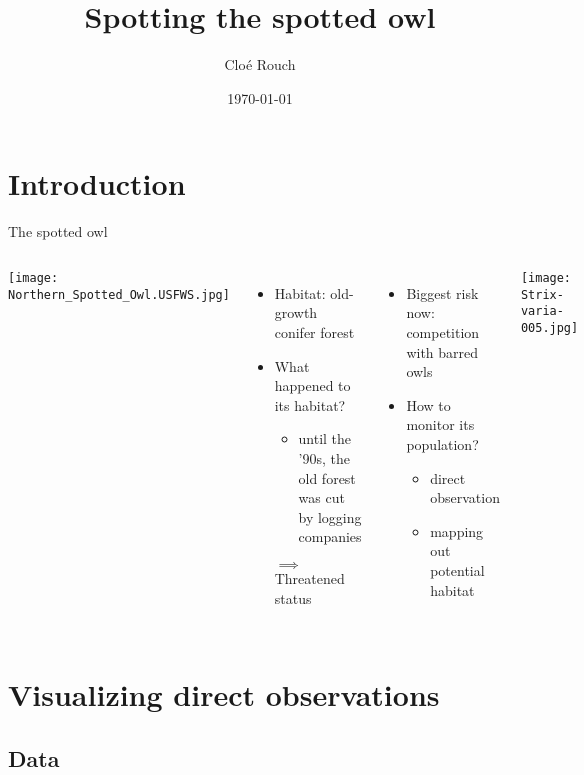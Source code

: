 \documentclass{beamer}
\title{Spotting the spotted owl}
\author{Cloé Rouch}
\date{\today}
\begin{document}
\maketitle

\section{Introduction}

\begin{frame}{The spotted owl}
    \begin{columns}
            \texttt{[image: Northern\_Spotted\_Owl.USFWS.jpg]} 
            \begin{itemize}
                \item Habitat: old-growth conifer forest
                \item What happened to its habitat?
                    \begin{itemize}
                        \item until the '90s, the old forest was cut by logging companies
                    \end{itemize}
                $\implies$ Threatened status 
            \end{itemize}
            \begin{itemize}
                \item Biggest risk now: competition with barred owls
                \item How to monitor its population?
                    \begin{itemize}
                        \item direct observation
                        \item mapping out potential habitat
                    \end{itemize}
            \end{itemize}
            \texttt{[image: Strix-varia-005.jpg]} 
    \end{columns}    
\end{frame}

\section{Visualizing direct observations}

\subsection{Data}
\end{document}
